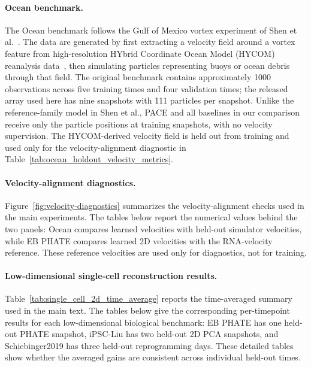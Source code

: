 \paragraph{Ocean benchmark.}
The Ocean benchmark follows the Gulf of Mexico vortex experiment of Shen et al.~\citep{shen2025multimarginal}. The data are generated by first extracting a velocity field around a vortex feature from high-resolution HYbrid Coordinate Ocean Model (HYCOM) reanalysis data~\citep{chassignet2007hycom}, then simulating particles representing buoys or ocean debris through that field. The original benchmark contains approximately 1000 observations across five training times and four validation times; the released array used here has nine snapshots with 111 particles per snapshot. Unlike the reference-family model in Shen et al., PACE and all baselines in our comparison receive only the particle positions at training snapshots, with no velocity supervision. The HYCOM-derived velocity field is held out from training and used only for the velocity-alignment diagnostic in Table~\ref{tab:ocean_holdout_velocity_metrics}.


\paragraph{Velocity-alignment diagnostics.}
Figure~\ref{fig:velocity-diagnostics} summarizes the velocity-alignment checks used in the main experiments. The tables below report the numerical values behind the two panels: Ocean compares learned velocities with held-out simulator velocities, while EB PHATE compares learned 2D velocities with the RNA-velocity reference. These reference velocities are used only for diagnostics, not for training.





\vspace{0.75em}


\paragraph{Low-dimensional single-cell reconstruction results.}
Table~\ref{tab:single_cell_2d_time_average} reports the time-averaged summary used in the main text. The tables below give the corresponding per-timepoint results for each low-dimensional biological benchmark: EB PHATE has one held-out PHATE snapshot, iPSC-Liu has two held-out 2D PCA snapshots, and Schiebinger2019 has three held-out reprogramming days. These detailed tables show whether the averaged gains are consistent across individual held-out times.

